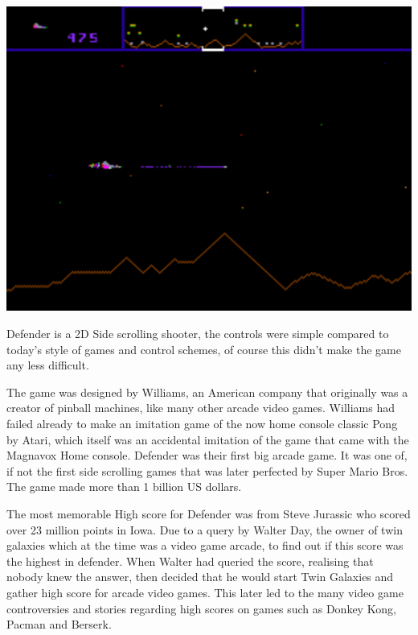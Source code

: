\documentclass{article}
\begin{document}
\begin{minipage}{0.4\textwidth}
\includegraphics[width=\linewidth]{defender}
\end{minipage} \hfill
\begin{minipage}{0.55\textwidth}\raggedright
Defender is a 2D Side scrolling shooter, the controls were simple compared to today's style of games and control schemes, of course this didn't make the game any less difficult. \newline \newline

The game was designed by Williams, an American company that originally was a creator of pinball machines, like many other arcade video games.
Williams had failed already to make an imitation game of the now home console classic Pong by Atari, which itself was an accidental imitation of the game that came with the Magnavox Home console. Defender was their first big arcade game. It was one of, if not the first side scrolling  games that was later perfected by Super Mario Bros. The game made more than 1 billion US dollars. \newline



\end{minipage} \newline \newline

The most memorable High score for Defender was from Steve Jurassic who scored over 23 million points in Iowa. Due to a query by Walter Day, the owner of twin galaxies which at the time was a video game arcade, to find out if this score was the highest in defender. When Walter had queried the score, realising that nobody knew the answer, then decided that he would start Twin Galaxies and gather high score for arcade video games. This later led to the many video game controversies and stories regarding high scores on games such as Donkey Kong, Pacman and Berserk. \newline
\end{document}
